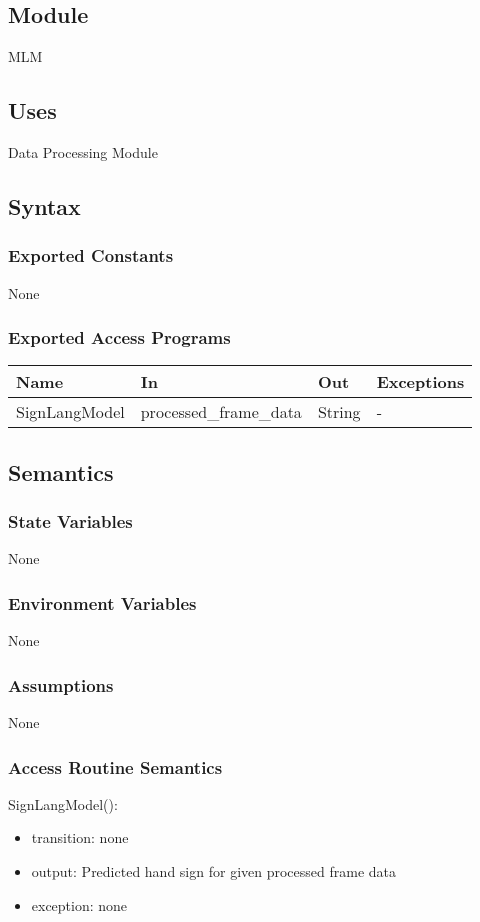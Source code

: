 \documentclass[12pt, titlepage]{article}
\begin{document}
\subsection{Module}
MLM
\subsection{Uses}
Data Processing Module
\subsection{Syntax}
\subsubsection{Exported Constants}
None
\subsubsection{Exported Access Programs}
\begin{center}
\begin{tabular}{p{4cm} p{5cm} p{2cm} p{2cm}}
\hline
\textbf{Name} & \textbf{In} & \textbf{Out} & \textbf{Exceptions} \\
\hline
SignLangModel & processed\_frame\_data & String & - \\
\hline
\end{tabular}
\end{center}
\subsection{Semantics}
\subsubsection{State Variables}
None
\subsubsection{Environment Variables}
None
\subsubsection{Assumptions}
None
\subsubsection{Access Routine Semantics}
SignLangModel():
\begin{itemize}
    \item transition: none
    \item output: Predicted hand sign for given processed frame data
    \item exception: none
\end{itemize}
\end{document}
